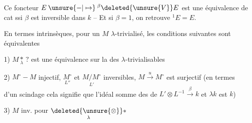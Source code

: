 Ce foncteur $E\mathbin{\unsure{-|\mapsto}}{}^\beta\deleted{\unsure{V}}E$  est une équivalence de cat ssi $\beta$ est inversible dans $k$ -- Et si $\beta=1$, on retrouve $\mathord{}^1E=E$.

En termes intrinsèques, pour  un $M$ $\lambda$-trivialisé, les conditions suivantes sont équivalentes

1) $M\mathbin{\underset{\lambda}{*}}\,?$ est une équivalence sur la  des $\lambda$-trivialisables

2) $M^\circ\mathbin{-}M$ injectif, $\underset{L''}{M^\circ}$ et $\underset{L'}{M/M^\circ}$ inversibles, $M\xrightarrow{u}M^\circ$ est surjectif
(en termes d'un scindage cela signifie que l'idéal somme des  de $L'\otimes L^{-1}\xrightarrow{\beta} k$ et $\lambda k$ est $k$)

3) $M$ inv. pour $\mathbin{\underset{\lambda}{\deleted{\unsure{\otimes}}*}}$
